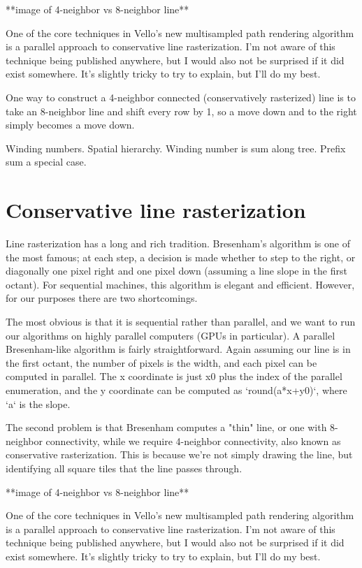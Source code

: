 \documentclass[format=acmsmall]{acmart}
\begin{document}
**image of 4-neighbor vs 8-neighbor line**

One of the core techniques in Vello's new multisampled path rendering algorithm is a parallel approach to conservative line rasterization. I'm not aware of this technique being published anywhere, but I would also not be surprised if it did exist somewhere. It's slightly tricky to try to explain, but I'll do my best.

One way to construct a 4-neighbor connected (conservatively rasterized) line is to take an 8-neighbor line and shift every row by 1, so a move down and to the right simply becomes a move down.

Winding numbers. Spatial hierarchy. Winding number is sum along tree. Prefix sum a special case.

\section{Conservative line rasterization}

Line rasterization has a long and rich tradition. Bresenham's algorithm is one of the most famous; at each step, a decision is made whether to step to the right, or diagonally one pixel right and one pixel down (assuming a line slope in the first octant). For sequential machines, this algorithm is elegant and efficient. However, for our purposes there are two shortcomings.

The most obvious is that it is sequential rather than parallel, and we want to run our algorithms on highly parallel computers (GPUs in particular). A parallel Bresenham-like algorithm is fairly straightforward. Again assuming our line is in the first octant, the number of pixels is the width, and each pixel can be computed in parallel. The x coordinate is just x0 plus the index of the parallel enumeration, and the y coordinate can be computed as `round(a*x+y0)`, where `a` is the slope.

The second problem is that Bresenham computes a "thin" line, or one with 8-neighbor connectivity, while we require 4-neighbor connectivity, also known as conservative rasterization. This is because we're not simply drawing the line, but identifying all square tiles that the line passes through.

**image of 4-neighbor vs 8-neighbor line**

One of the core techniques in Vello's new multisampled path rendering algorithm is a parallel approach to conservative line rasterization. I'm not aware of this technique being published anywhere, but I would also not be surprised if it did exist somewhere. It's slightly tricky to try to explain, but I'll do my best.
\end{document}
